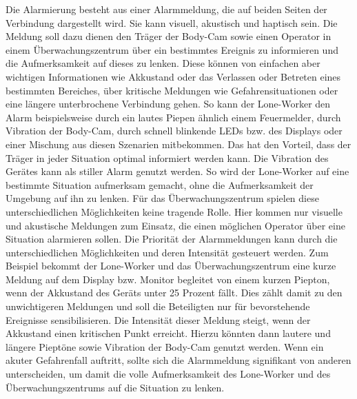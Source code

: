 \documentclass[thesis.tex]{subfiles}
\begin{document}
Die Alarmierung besteht aus einer Alarmmeldung, die auf beiden Seiten der Verbindung dargestellt wird.
Sie kann visuell, akustisch und haptisch sein.
Die Meldung soll dazu dienen den Träger der Body-Cam sowie einen Operator in einem Überwachungszentrum über ein bestimmtes Ereignis zu informieren und die Aufmerksamkeit auf dieses zu lenken.
Diese können von einfachen aber wichtigen Informationen wie Akkustand oder das Verlassen oder Betreten eines bestimmten Bereiches, über kritische Meldungen wie Gefahrensituationen oder eine längere unterbrochene Verbindung gehen.
So kann der Lone-Worker den Alarm beispielsweise durch ein lautes Piepen ähnlich einem Feuermelder, durch Vibration der Body-Cam, durch schnell blinkende LEDs bzw. des Displays oder einer Mischung aus diesen Szenarien mitbekommen.
Das hat den Vorteil, dass der Träger in jeder Situation optimal informiert werden kann.
Die Vibration des Gerätes kann als stiller Alarm genutzt werden.
So wird der Lone-Worker auf eine bestimmte Situation aufmerksam gemacht, ohne die Aufmerksamkeit der Umgebung auf ihn zu lenken.
Für das Überwachungszentrum spielen diese unterschiedlichen Möglichkeiten keine tragende Rolle.
Hier kommen nur visuelle und akustische Meldungen zum Einsatz, die einen möglichen Operator über eine Situation alarmieren sollen.
Die Priorität der Alarmmeldungen kann durch die unterschiedlichen Möglichkeiten und deren Intensität gesteuert werden.
Zum Beispiel bekommt der Lone-Worker und das Überwachungszentrum eine kurze Meldung auf dem Display bzw. Monitor begleitet von einem kurzen Piepton, wenn der Akkustand des Geräts unter 25 Prozent fällt.
Dies zählt damit zu den unwichtigeren Meldungen und soll die Beteiligten nur für bevorstehende Ereignisse sensibilisieren.
Die Intensität dieser Meldung steigt, wenn der Akkustand einen kritischen Punkt erreicht.
Hierzu könnten dann lautere und längere Pieptöne sowie Vibration der Body-Cam genutzt werden.
Wenn ein akuter Gefahrenfall auftritt, sollte sich die Alarmmeldung signifikant von anderen unterscheiden, um damit die volle Aufmerksamkeit des Lone-Worker und des Überwachungszentrums auf die Situation zu lenken.
\end{document}
